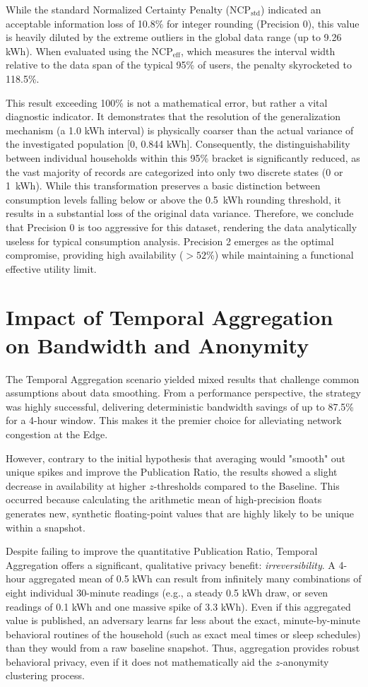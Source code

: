 While the standard Normalized Certainty Penalty ($\text{NCP}_{\text{std}}$) indicated an acceptable information loss of 10.8\% for integer rounding (Precision 0), this value is heavily diluted by the extreme outliers in the global data range (up to 9.26 kWh). When evaluated using the $\text{NCP}_{\text{eff}}$, which measures the interval width relative to the data span of the typical 95\% of users, the penalty skyrocketed to 118.5\%. 

This result exceeding 100\% is not a mathematical error, but rather a vital diagnostic indicator. It demonstrates that the resolution of the generalization mechanism (a 1.0 kWh interval) is physically coarser than the actual variance of the investigated population [0, 0.844 kWh]. Consequently, the distinguishability between individual households within this 95\% bracket is significantly reduced, as the vast majority of records are categorized into only two discrete states (0 or 1~kWh). While this transformation preserves a basic distinction between consumption levels falling below or above the 0.5~kWh rounding threshold, it results in a substantial loss of the original data variance. Therefore, we conclude that Precision 0 is too aggressive for this dataset, rendering the data analytically useless for typical consumption analysis. Precision 2 emerges as the optimal compromise, providing high availability ($>52\%$) while maintaining a functional effective utility limit.

\section{Impact of Temporal Aggregation on Bandwidth and Anonymity}
The Temporal Aggregation scenario yielded mixed results that challenge common assumptions about data smoothing. From a performance perspective, the strategy was highly successful, delivering deterministic bandwidth savings of up to 87.5\% for a 4-hour window. This makes it the premier choice for alleviating network congestion at the Edge.

However, contrary to the initial hypothesis that averaging would "smooth" out unique spikes and improve the Publication Ratio, the results showed a slight decrease in availability at higher $z$-thresholds compared to the Baseline. This occurred because calculating the arithmetic mean of high-precision floats generates new, synthetic floating-point values that are highly likely to be unique within a snapshot.

Despite failing to improve the quantitative Publication Ratio, Temporal Aggregation offers a significant, qualitative privacy benefit: \textit{irreversibility}. A 4-hour aggregated mean of 0.5 kWh can result from infinitely many combinations of eight individual 30-minute readings (e.g., a steady 0.5 kWh draw, or seven readings of 0.1 kWh and one massive spike of 3.3 kWh). Even if this aggregated value is published, an adversary learns far less about the exact, minute-by-minute behavioral routines of the household (such as exact meal times or sleep schedules) than they would from a raw baseline snapshot. Thus, aggregation provides robust behavioral privacy, even if it does not mathematically aid the $z$-anonymity clustering process.

